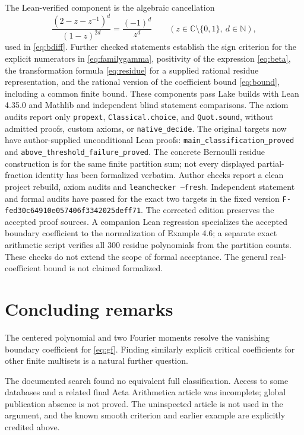 \documentclass[11pt,reqno]{amsart}
\theoremstyle{remark}
\newcommand{\NN}{\mathbb{N}}
\newcommand{\CC}{\mathbb{C}}
\begin{document}
The Lean-verified component is the algebraic cancellation
\[
 \frac{(2-z-z^{-1})^d}{(1-z)^{2d}}
       =\frac{(-1)^d}{z^d}
 \qquad(z\in\CC\setminus\{0,1\},\ d\in\NN),
\]
used in \eqref{eq:bdiff}. Further checked statements establish the sign criterion
for the explicit numerators in \eqref{eq:familygamma}, positivity of the
expression \eqref{eq:beta}, the transformation formula \eqref{eq:residue}
for a supplied rational residue representation, and the rational version of
the coefficient bound \eqref{eq:bound}, including a common finite bound.
These components pass Lake builds with Lean 4.35.0 and Mathlib and independent
blind statement comparisons. The axiom audits report only \texttt{propext},
\texttt{Classical.choice}, and \texttt{Quot.sound}, without admitted proofs,
custom axioms, or \texttt{native\_decide}.
The original targets now have author-supplied unconditional Lean proofs:
\texttt{main\_classification\_proved} and
\texttt{above\_threshold\_failure\_proved}. The concrete Bernoulli residue
construction is for the same finite partition sum; not every displayed
partial-fraction identity has been formalized verbatim. Author checks report
a clean project rebuild, axiom audits and \texttt{leanchecker --fresh}.
Independent statement and formal audits have passed for the exact two
targets in the fixed version
\texttt{F-fed30c64910e057406f3342025deff71}. The corrected edition
preserves the accepted proof sources. A companion Lean regression
specializes the accepted boundary coefficient to the normalization of
Example 4.6; a separate exact arithmetic script verifies all \(300\)
residue polynomials from the partition counts. These checks do not
extend the scope of formal acceptance. The general real-coefficient
bound is not claimed formalized.

\section{Concluding remarks}

The centered polynomial and two Fourier moments resolve the vanishing
boundary coefficient for \eqref{eq:gf}. Finding similarly explicit critical
coefficients for other finite multisets is a natural further question.

The documented search found no equivalent full classification. Access to
some databases and a related final Acta Arithmetica article was incomplete;
global publication absence is not proved. The uninspected article is not
used in the argument, and the known smooth criterion and earlier example
are explicitly credited above.
\end{document}
